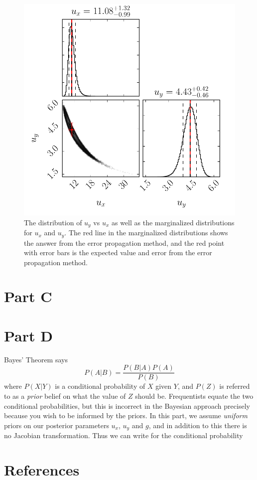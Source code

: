 \documentclass[12pt,a4paper]{article}
\begin{document}
\begin{enumerate}[a)]
 \begin{figure}[ht]
  \centering
  \includegraphics[keepaspectratio]{hw2_b_corner.pdf}
  \caption{The distribution of $u_y$ vs $u_x$ as well as the marginalized distributions for $u_x$ and $u_y$. The red line in the marginalized distributions shows the answer from the error propagation method, and the red point with error bars is the expected value and error from the error propagation method.}
  \label{fig:2.1b}
 \end{figure}
\end{enumerate}

\section{Part C}

\section{Part D}
Bayes' Theorem says
\begin{equation}
  P(A|B) = \frac{P(B|A)P(A)}{P(B)}
\end{equation}
where $P(X|Y)$ is a conditional probability of $X$ given $Y$, and $P(Z)$ is 
referred to as a \textit{prior} belief on what the value of $Z$ should be.
Frequentists equate the two conditional probabilities, but this is incorrect
in the Bayesian approach precisely because you wish to be informed by the 
priors. In this part, we assume \textit{uniform} priors on our posterior
parameters $u_x$, $u_y$ and $g$, and in addition to this there is no Jacobian 
transformation. Thus we can write for the conditional probability
\begin{equation}

\end{equation}

\newpage

\section*{References}
\end{document}
